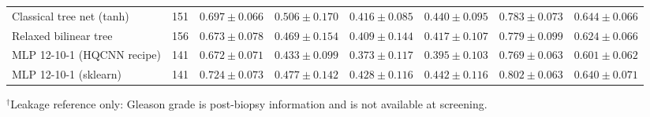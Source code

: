 \begin{table}[t]
\begin{tabular}{lccccccc}
Classical tree net (tanh) & 151 & $0.697 \pm 0.066$ & $0.506 \pm 0.170$ & $0.416 \pm 0.085$ & $0.440 \pm 0.095$ & $0.783 \pm 0.073$ & $0.644 \pm 0.066$ \\
Relaxed bilinear tree & 156 & $0.673 \pm 0.078$ & $0.469 \pm 0.154$ & $0.409 \pm 0.144$ & $0.417 \pm 0.107$ & $0.779 \pm 0.099$ & $0.624 \pm 0.066$ \\
MLP 12-10-1 (HQCNN recipe) & 141 & $0.672 \pm 0.071$ & $0.433 \pm 0.099$ & $0.373 \pm 0.117$ & $0.395 \pm 0.103$ & $0.769 \pm 0.063$ & $0.601 \pm 0.062$ \\
MLP 12-10-1 (sklearn) & 141 & $0.724 \pm 0.073$ & $0.477 \pm 0.142$ & $0.428 \pm 0.116$ & $0.442 \pm 0.116$ & $0.802 \pm 0.063$ & $0.640 \pm 0.071$ \\
\bottomrule
\end{tabular}
\par\smallskip\footnotesize $^{\dagger}$Leakage reference only: Gleason grade is post-biopsy information and is not available at screening.
\end{table}
